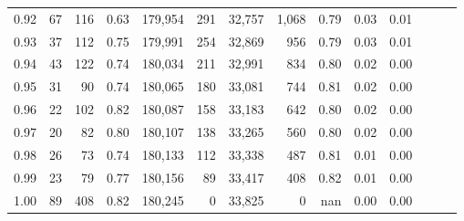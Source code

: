 \begin{tabular}{rrrrrrrrrrrrrr}
0.92 &     67 &  116 &  0.63 &  179,954 &      291 &  32,757 &   1,068 &  0.79 &  0.03 &      0.01 \\
0.93 &     37 &  112 &  0.75 &  179,991 &      254 &  32,869 &     956 &  0.79 &  0.03 &      0.01 \\
0.94 &     43 &  122 &  0.74 &  180,034 &      211 &  32,991 &     834 &  0.80 &  0.02 &      0.00 \\
0.95 &     31 &   90 &  0.74 &  180,065 &      180 &  33,081 &     744 &  0.81 &  0.02 &      0.00 \\
0.96 &     22 &  102 &  0.82 &  180,087 &      158 &  33,183 &     642 &  0.80 &  0.02 &      0.00 \\
0.97 &     20 &   82 &  0.80 &  180,107 &      138 &  33,265 &     560 &  0.80 &  0.02 &      0.00 \\
0.98 &     26 &   73 &  0.74 &  180,133 &      112 &  33,338 &     487 &  0.81 &  0.01 &      0.00 \\
0.99 &     23 &   79 &  0.77 &  180,156 &       89 &  33,417 &     408 &  0.82 &  0.01 &      0.00 \\
1.00 &     89 &  408 &  0.82 &  180,245 &        0 &  33,825 &       0 &   nan &  0.00 &      0.00 \\
\bottomrule
\end{tabular}

